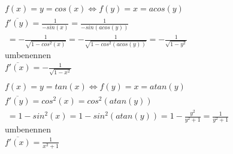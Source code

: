 \begin{gather*}
  f(x) = y = cos(x) \Leftrightarrow f(y) = x = acos(y) \\
  \overline{f'(y)} = \frac{1}{-sin(x)} = \frac{1}{-sin(acos(y))} \\
  \;= -\frac{1}{\sqrt{1 - cos^2(x)}} = -\frac{1}{\sqrt{1 - cos^2(acos(y))}} = -\frac{1}{\sqrt{1 - y^2}} \\
  \text{umbenennen} \\
  \overline{f'(x)} = -\frac{1}{\sqrt{1 - x^2}} \\\\
  f(x) = y = tan(x) \Leftrightarrow f(y) = x = atan(y) \\
  \overline{f'(y)} = cos^2(x) = cos^2(atan(y)) \\
  \;= 1 - sin^2(x) = 1 - sin^2(atan(y)) = 1 - \frac{y^2}{y^2 + 1} = \frac{1}{y^2 + 1} \\
  \text{umbenennen} \\
  \overline{f'(x)} = \frac{1}{x^2 + 1}
\end{gather*}
